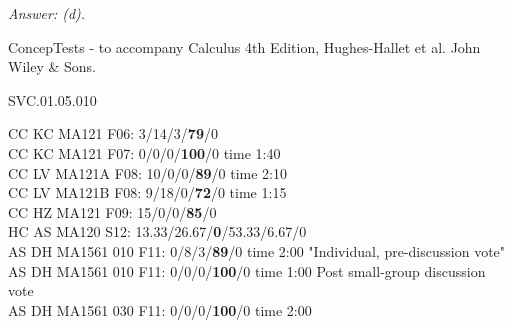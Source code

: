 {\it Answer: (d).} 

\medskip
ConcepTests - to accompany Calculus 4th Edition, Hughes-Hallet et al. John Wiley \& Sons.

SVC.01.05.010

CC KC MA121 F06: 3/14/3/{\bf 79}/0 \\
CC KC MA121 F07: 0/0/0/{\bf 100}/0  time 1:40\\
CC LV MA121A F08: 10/0/0/{\bf89}/0 time 2:10\\
CC LV MA121B F08: 9/18/0/{\bf72}/0 time 1:15\\
CC HZ MA121 F09: 15/0/0/{\bf85}/0  \\
HC AS MA120 S12: 13.33/26.67/{\bf0}/53.33/6.67/0  \\
AS DH MA1561 010 F11: 0/8/3/{\bf89}/0 time 2:00 "Individual, pre-discussion vote" \\
AS DH MA1561 010 F11: 0/0/0/{\bf100}/0 time 1:00 Post small-group discussion vote \\
AS DH MA1561 030 F11: 0/0/0/{\bf100}/0 time 2:00  \\
